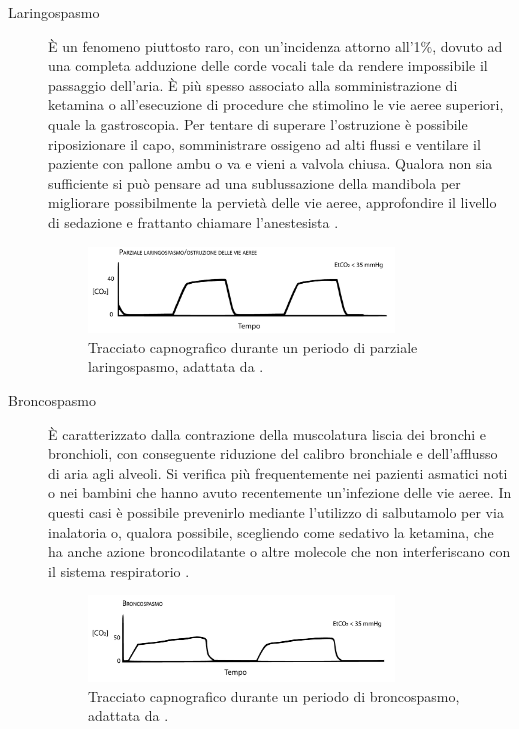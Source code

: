\begin{description}
\item[Laringospasmo] \`E un fenomeno piuttosto raro, con un'incidenza attorno all'1$\%$, dovuto ad una completa adduzione delle corde vocali tale da rendere impossibile il passaggio dell'aria. \`E più spesso associato alla somministrazione di ketamina o all'esecuzione di procedure che stimolino le vie aeree superiori, quale la gastroscopia. Per tentare di superare l'ostruzione è possibile riposizionare il capo, somministrare ossigeno ad alti flussi e ventilare il paziente con pallone ambu o va e vieni a valvola chiusa. Qualora non sia sufficiente si può pensare ad una sublussazione della mandibola per migliorare possibilmente la pervietà delle vie aeree, approfondire il livello di sedazione e frattanto chiamare l'anestesista \cite{Simeupsedazione}. 

\begin{figure}[h]
    \centering
    \includegraphics[width=0.8\textwidth]{Figure/laringospasmo.pdf}
    \caption{Tracciato capnografico durante un periodo di parziale laringospasmo, adattata da \cite{Baruch2005}.}
    \label{fig:laringo}
\end{figure}

\item[Broncospasmo] \`E caratterizzato dalla contrazione della muscolatura liscia dei bronchi e bronchioli, con conseguente riduzione del calibro bronchiale e dell'afflusso di aria agli alveoli. Si verifica più frequentemente nei pazienti asmatici noti o nei bambini che hanno avuto recentemente un'infezione delle vie aeree. In questi casi è possibile prevenirlo mediante l'utilizzo di salbutamolo per via inalatoria o, qualora possibile, scegliendo come sedativo la ketamina, che ha anche azione broncodilatante o altre molecole che non interferiscano con il sistema respiratorio \cite{Simeupsedazione}.

\begin{figure}[h]
    \centering
    \includegraphics[width=0.8\textwidth]{Figure/broncospasmo.pdf}
    \caption{Tracciato capnografico durante un periodo di broncospasmo, adattata da \cite{Baruch2005}.}
    \label{fig:bronco}
\end{figure}

\end{description}

